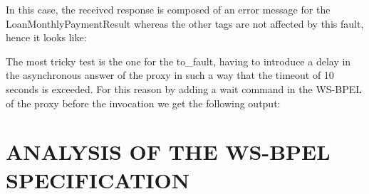 \documentclass[
10pt, %
a4paper, %
oneside, %
headinclude,footinclude, %
BCOR5mm, %
]{scrartcl}
\newcommand{\xmlscript}[2]{

}
\begin{document}
In this case, the received response is composed of an error message for
the LoanMonthlyPaymentResult whereas the other tags are not affected by
this fault, hence it looks like:

\xmlscript{./code/loanfaultresponse}{}

The most tricky test is the one for the to\_fault, having to introduce a delay
in the asynchronous answer of the proxy in such a way that the timeout of
10 seconds is exceeded. For this reason by adding a wait command in the
WS-BPEL of the proxy before the invocation we get the following output:

\xmlscript{./code/timeoutfaultresponse}{}




\section{ANALYSIS OF THE WS-BPEL SPECIFICATION}
\end{document}
